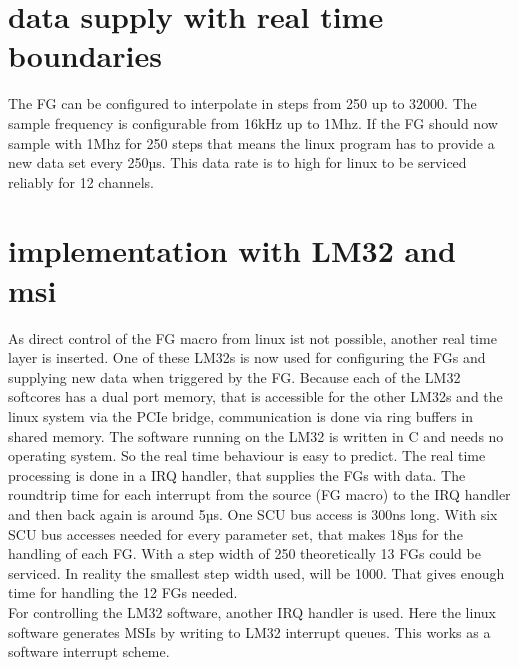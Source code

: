 \documentclass[a4paper,
              ]{jacow}
\begin{document}
\section{data supply with real time boundaries}
The FG can be configured to interpolate in steps from 250 up to 32000. The sample frequency is configurable from 16kHz up to 1Mhz. If the FG should now sample with 1Mhz for 250 steps
that means the linux program has to provide a new data set every 250µs. This data rate is to high for linux to be serviced reliably for 12 channels.

\section{implementation with LM32 and msi}
As direct control of the FG macro from linux ist not possible, another real time layer is inserted. 
One of these LM32s is now used for configuring the FGs and supplying new data when triggered by the FG.
Because each of the LM32 softcores has a dual port memory, that is accessible for the other LM32s and the linux system via the PCIe bridge, communication is done via ring buffers in shared memory. The software running on the LM32 is written in C and needs no operating system. So the real time behaviour is easy to predict. The real time processing is done in a IRQ handler, that supplies the FGs with data. The roundtrip time for each interrupt from the source (FG macro) to the IRQ handler and then back again is around 5µs. One SCU bus access is 300ns long. With six SCU bus accesses needed for every parameter set, that makes 18µs for the handling of each FG. With a step width of 250 theoretically 13 FGs could be serviced. In reality the smallest step width used, will be 1000. That gives enough time for handling the 12 FGs needed.\\
For controlling the LM32 software, another IRQ handler is used. Here the linux software generates MSIs by writing to LM32 interrupt queues. This works as a software interrupt scheme.
\end{document}
